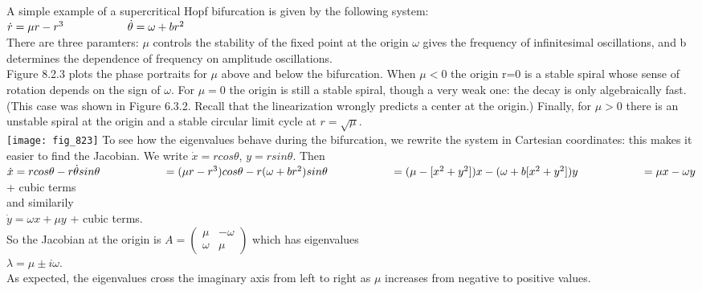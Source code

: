\documentclass{article}
\newcommand\tab[1][1cm]{\hspace*{#1}}
\begin{document}
A simple example of a supercritical Hopf bifurcation is given by the following system: \\ \tab \tab
$\dot{r}=\mu r - r^{3} \\ \tab \tab
\dot{\theta}=\omega+br^{2}$ \\
There are three paramters: $\mu$ controls the stability of the fixed point at the origin $\omega$ gives the frequency of infinitesimal oscillations, and b determines the dependence of frequency on amplitude oscillations. \\ \tab
Figure 8.2.3 plots the phase portraits for $\mu$ above and below the bifurcation. When $\mu < 0$ the origin r=0 is a stable spiral whose sense of rotation depends on the sign of $\omega$. For $\mu=0$ the origin is still a stable spiral, though a very weak one: the decay is only algebraically fast. (This case was shown in Figure 6.3.2. Recall that the linearization wrongly predicts a center at the origin.) Finally, for $\mu > 0$ there is an unstable spiral at the origin and a stable circular limit cycle at $r=\sqrt{\mu}$. \\
\texttt{[image: fig\_823]}
\tab To see how the eigenvalues behave during the bifurcation, we rewrite the system in Cartesian coordinates: this makes it easier to find the Jacobian. We write $\dot{x}=rcos\theta$, $y=rsin\theta$. Then \\ \tab \tab
$\dot{x}=rcos\theta - r \dot{\theta}sin\theta \\
\tab \tab = (\mu r- r^{3})cos \theta - r(\omega + br^{2})sin \theta \\
\tab \tab =(\mu -[x^{2}+y^{2}])x - (\omega + b[x^{2}+y^{2}])y \\ \tab \tab
= \mu x - \omega y$ + cubic terms \\
and similarily \\ \tab \tab
$\dot{y}=\omega x + \mu y$ + cubic terms. \\ 
So the Jacobian at the origin is 
${A=
\begin{pmatrix}
\mu & -\omega \\
\omega & \mu
\end{pmatrix}
}$
which has eigenvalues 
\\ \tab \tab
$\lambda = \mu \pm i \omega$. \\
As expected, the eigenvalues cross the imaginary axis from left to right as $\mu$ increases from negative to positive values. 
\end{document}
